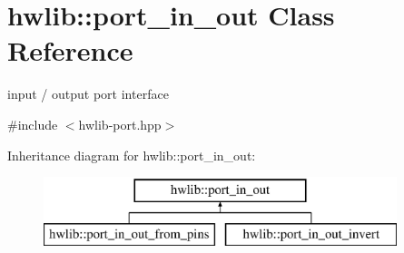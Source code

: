 \hypertarget{classhwlib_1_1port__in__out}{}\section{hwlib\+:\+:port\+\_\+in\+\_\+out Class Reference}
\label{classhwlib_1_1port__in__out}


input / output port interface  




{\ttfamily \#include $<$hwlib-\/port.\+hpp$>$}

Inheritance diagram for hwlib\+:\+:port\+\_\+in\+\_\+out\+:\begin{figure}[H]
\begin{center}
\leavevmode
\includegraphics[height=2.000000cm]{classhwlib_1_1port__in__out}
\end{center}
\end{figure}
